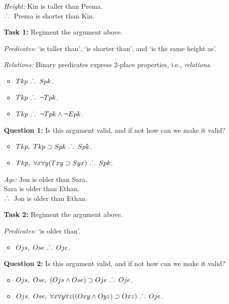 \documentclass[a4paper, 11pt]{article} %
\def\therefore{\ensuremath{\ldotp\dot{}\,\ldotp}}
\begin{document}
\begin{enumerate}
  \item[\it Height:]
    Kin is taller than Prema.\\ 
    \therefore\ Prema is shorter than Kin.
  \item[\bf Task 1:] Regiment the argument above.
  \item[\it Predicates:] `is taller than', `is shorter than', and `is the same height as'.
  \item[\it Relations:] Binary predicates express $2$-place properties, i.e., \textit{relations}. 
    \begin{itemize}
      \item $Tkp\ \therefore\ Spk$.
      \item $Tkp\ \therefore\ \neg Tpk$.
      \item $Tkp\ \therefore\ \neg Tpk \wedge \neg Epk$.
    \end{itemize}
  \item[\bf Question 1:] Is this argument valid, and if not how can we make it valid?
    \begin{itemize}
      \item $Tkp,\ Tkp \supset Spk\ \therefore\ Spk$.
      \item $Tkp,\ \forall x \forall y(Txy \supset Syx)\ \therefore\ Spk$.
    \end{itemize}
  \item[\it Age:] 
    Jon is older than Sara.\\ 
    Sara is older than Ethan.\\
    \therefore\ Jon is older than Ethan.
  \item[\bf Task 2:] Regiment the argument above.
  \item[\it Predicates:] `is older than'.
    \begin{itemize}
      \item $Ojs,\ Ose\ \therefore\ Oje$.
    \end{itemize}
  \item[\bf Question 2:] Is this argument valid, and if not how can we make it valid?
    \begin{itemize}
      \item $Ojs,\ Ose,\ (Ojs \wedge Ose) \supset Oje\ \therefore\ Oje$.
      \item $Ojs,\ Ose,\ \forall x \forall y \forall z((Oxy \wedge Oyz) \supset Oxz)\ \therefore\ Oje$.
    \end{itemize}
\end{enumerate}
\end{document}
